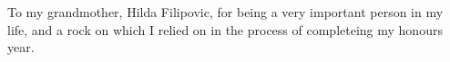 \vspace*{7cm}
\begin{center}
  To my grandmother, Hilda Filipovic, for being a very important person in my life, and a rock on which I relied on in the process of completeing my honours year.
\end{center}

\vspace*{4cm}